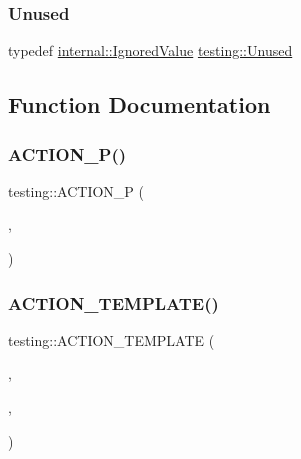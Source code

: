 \mbox{\label{namespacetesting_a603e329ec0263ebfcf16f712810bd511}} 
\subsubsection{\texorpdfstring{Unused}{Unused}}
{\footnotesize\ttfamily typedef \mbox{\hyperlink{classtesting_1_1internal_1_1_ignored_value}{internal\+::\+Ignored\+Value}} \mbox{\hyperlink{namespacetesting_a603e329ec0263ebfcf16f712810bd511}{testing\+::\+Unused}}}



\subsection{Function Documentation}
\mbox{\label{namespacetesting_a3d58f0d746946064154cd257d368599d}} 
\subsubsection{\texorpdfstring{ACTION\_P()}{ACTION\_P()}}
{\footnotesize\ttfamily testing\+::\+A\+C\+T\+I\+O\+N\+\_\+P (\begin{DoxyParamCaption}\item[{Return\+Pointee}]{,  }\item[{pointer}]{ }\end{DoxyParamCaption})}

\mbox{\label{namespacetesting_a109d48f969260878ed1e743006196992}} 
\subsubsection{\texorpdfstring{ACTION\_TEMPLATE()}{ACTION\_TEMPLATE()}\hspace{0.1cm}{\footnotesize\ttfamily [1/28]}}
{\footnotesize\ttfamily testing\+::\+A\+C\+T\+I\+O\+N\+\_\+\+T\+E\+M\+P\+L\+A\+TE (\begin{DoxyParamCaption}\item[{Return\+Arg}]{,  }\item[{H\+A\+S\+\_\+1\+\_\+\+T\+E\+M\+P\+L\+A\+T\+E\+\_\+\+P\+A\+R\+A\+MS(int, k)}]{,  }\item[{A\+N\+D\+\_\+0\+\_\+\+V\+A\+L\+U\+E\+\_\+\+P\+A\+R\+A\+MS()}]{ }\end{DoxyParamCaption})}

